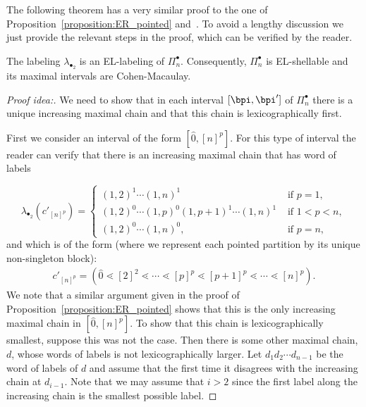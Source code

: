 The following theorem has a very similar proof to the one of Proposition~\ref{proposition:ER_pointed} and~\cite[Theorem 3.2]{GonzalezDleonWachs2016}. To avoid a lengthy discussion we just provide the relevant steps in the proof, which can be verified by the reader.
\begin{theo}\label{theorem:EL-labeling_pointed}
 The labeling $\lambda_{\bullet_2}$ is an EL-labeling of $\Pi_n^{\bullet}$.  Consequently, $\Pi_n^{\bullet}$ is EL-shellable and its maximal intervals are Cohen-Macaulay.
\end{theo}
\begin{proof}[Proof idea:] We need to show that in each interval $[\bpi,\bpi']$ of $\Pi_n^{\bullet}$ there is a unique increasing maximal chain and that this chain is lexicographically first.

First we consider an interval of the form $[\hat{0},[n]^p]$. For this type of interval the reader can verify that there is an  increasing maximal chain  that has word of labels

\begin{equation}\label{equation:increasing_chain_pointed_2}
    \lambda_{\bullet_2}(c' _{[n]^p})=
    \begin{cases}
      (1,2)^{1}\cdots(1,n)^1 & \text{ if } p =1,\\ (1,2)^{0}\cdots(1,p)^0(1,p+1)^1\cdots(1,n)^1 & \text{ if } 1<p<n,\\
       (1,2)^{0}\cdots(1,n)^0, & \text{ if } p=n,
    \end{cases}
 \end{equation}   
 and which is of the form (where we represent each pointed partition by its unique non-singleton block):
\begin{align*}
    c'_{[n]^p}=(\hat{0}\lessdot [2]^2\lessdot \cdots \lessdot [p]^{p} \lessdot [p+1]^{p} \lessdot \cdots \lessdot [n]^{p}).
\end{align*}
We note that a similar argument given in the proof of Proposition~\ref{proposition:ER_pointed} shows that this is the only increasing maximal chain in  $[\hat{0},[n]^p]$. To show that this chain is lexicographically smallest, suppose this was not the case.   Then there is some other maximal chain, $d$, whose words of labels  is not lexicographically larger.  Let $d_1d_2\cdots d_{n-1}$ be the word of labels of $d$ and assume that the first time it disagrees with the increasing chain at $d_{i-1}$. Note that we may assume that $i>2$ since the first label along the increasing chain is the smallest possible label.


\end{proof}
